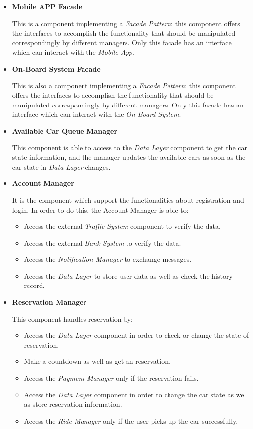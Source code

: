 \documentclass[a4paper,11pt]{article}
\begin{document}
\begin{itemize}
			\item \textbf{Mobile APP Facade}
			
This is a component implementing a \textsl{Facade Pattern}: this component offers the interfaces to accomplish the functionality that should be manipulated correspondingly by different managers. Only this facade has an interface which can interact with the \textsl{Mobile App}.

			\item \textbf{On-Board System Facade}
			
This is also a component implementing a \textsl{Facade Pattern}: this component offers the interfaces to accomplish the functionality that should be manipulated correspondingly by different managers. Only this facade has an interface which can interact with the \textsl{On-Board System}.

			\item \textbf{Available Car Queue Manager}
			
This component is able to access to the \textsl{Data Layer} component to get the car state information, and the manager updates the available cars as soon as the car state in \textsl{Data Layer} changes.

			\item \textbf{Account Manager}
			
It is the component which support the functionalities about registration and login. In order to do this, the Account Manager is able to:
			\begin{itemize}
				\item Access the external \textsl{Traffic System} component to verify the data.
				\item Access the external \textsl{Bank System} to verify the data.
				\item Access the \textsl{Notification Manager} to exchange messages.
				\item Access the \textsl{Data Layer} to store user data as well as check the history record.
			\end{itemize}

			\item \textbf{Reservation Manager}
			
This component handles reservation by:
			\begin{itemize}
				\item Access the \textsl{Data Layer} component in order to check or change the state of reservation.
				\item Make a countdown as well as get an reservation.
				\item Access the \textsl{Payment Manager} only if the reservation fails.
				\item Access the \textsl{Data Layer} component in order to change the car state as well as store reservation information.
				\item Access the \textsl{Ride Manager} only if the user picks up the car successfully.
			\end{itemize}
			

\end{itemize}
\end{document}
